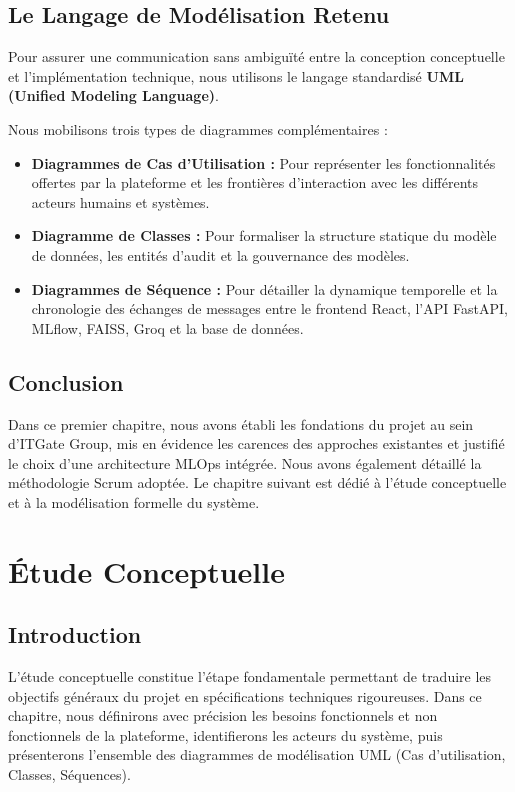 \documentclass[11pt,a4paper,oneside]{report}
\begin{document}
\section{Le Langage de Modélisation Retenu}
Pour assurer une communication sans ambiguïté entre la conception conceptuelle et l'implémentation technique, nous utilisons le langage standardisé \textbf{UML (Unified Modeling Language)}. 

Nous mobilisons trois types de diagrammes complémentaires :
\begin{itemize}[leftmargin=0.8cm, itemsep=0.5pt, topsep=1pt]
    \item \textbf{Diagrammes de Cas d'Utilisation :} Pour représenter les fonctionnalités offertes par la plateforme et les frontières d'interaction avec les différents acteurs humains et systèmes.
    \item \textbf{Diagramme de Classes :} Pour formaliser la structure statique du modèle de données, les entités d'audit et la gouvernance des modèles.
    \item \textbf{Diagrammes de Séquence :} Pour détailler la dynamique temporelle et la chronologie des échanges de messages entre le frontend React, l'API FastAPI, MLflow, FAISS, Groq et la base de données.
\end{itemize}

\section{Conclusion}
Dans ce premier chapitre, nous avons établi les fondations du projet au sein d'ITGate Group, mis en évidence les carences des approches existantes et justifié le choix d'une architecture MLOps intégrée. Nous avons également détaillé la méthodologie Scrum adoptée. Le chapitre suivant est dédié à l'étude conceptuelle et à la modélisation formelle du système.

\newpage

\chapter{Étude Conceptuelle}

\section{Introduction}
L'étude conceptuelle constitue l'étape fondamentale permettant de traduire les objectifs généraux du projet en spécifications techniques rigoureuses. Dans ce chapitre, nous définirons avec précision les besoins fonctionnels et non fonctionnels de la plateforme, identifierons les acteurs du système, puis présenterons l'ensemble des diagrammes de modélisation UML (Cas d'utilisation, Classes, Séquences).
\end{document}
